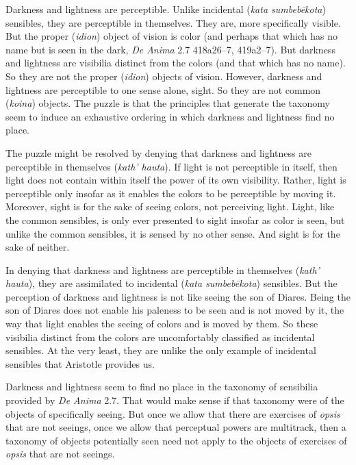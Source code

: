 Darkness and lightness are perceptible. Unlike incidental (\emph{kata sumbebēkota}) sensibles, they are perceptible in themselves. They are, more specifically visible. But the proper (\emph{idion}) object of vision is color (and perhaps that which has no name but is seen in the dark, \emph{De Anima} 2.7 418a26–7, 419a2–7). But darkness and lightness are visibilia distinct from the colors (and that which has no name). So they are not the proper (\emph{idion}) objects of vision. However, darkness and lightness are perceptible to one sense alone, sight. So they are not common (\emph{koina}) objects. The puzzle is that the principles that generate the taxonomy seem to induce an exhaustive ordering in which darkness and lightness find no place. 

The puzzle might be resolved by denying that darkness and lightness are perceptible in themselves (\emph{kath' hauta}). If light is not perceptible in itself, then light does not contain within itself the power of its own visibility. Rather, light is perceptible only insofar as it enables the colors to be perceptible by moving it. Moreover, sight is for the sake of seeing colors, not perceiving light. Light, like the common sensibles, is only ever presented to sight insofar as color is seen, but unlike the common sensibles, it is sensed by no other sense. And sight is for the sake of neither.

In denying that darkness and lightness are perceptible in themselves (\emph{kath' hauta}), they are assimilated to incidental (\emph{kata sumbebēkota}) sensibles. But the perception of darkness and lightness is not like seeing the son of Diares. Being the son of Diares does not enable his paleness to be seen and is not moved by it, the way that light enables the seeing of colors and is moved by them. So these visibilia distinct from the colors are uncomfortably classified as incidental sensibles. At the very least, they are unlike the only example of incidental sensibles that Aristotle provides us.

Darkness and lightness seem to find no place in the taxonomy of sensibilia provided by \emph{De Anima} 2.7. That would make sense if that taxonomy were of the objects of specifically seeing. But once we allow that there are exercises of \emph{opsis} that are not seeings, once we allow that perceptual powers are multitrack, then a taxonomy of objects potentially seen need not apply to the objects of exercises of \emph{opsis} that are not seeings.

